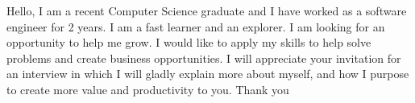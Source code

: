 Hello, I am a recent Computer Science graduate and I have worked as a software engineer for 2 years. I am a fast learner and an explorer. I am looking for an opportunity to help me grow. I would like to apply my skills to help solve problems and create business opportunities. I will appreciate your invitation for an interview in which I will gladly explain more about myself, and how I purpose to create more value and productivity to you. Thank you